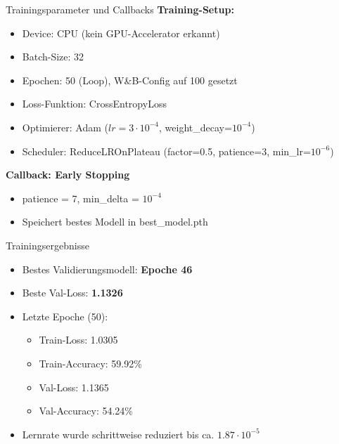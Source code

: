\documentclass{beamer}
\begin{document}
\begin{frame}{Trainingsparameter und Callbacks}
\textbf{Training-Setup:}
\begin{itemize}
    \item Device: CPU (kein GPU-Accelerator erkannt)
    \item Batch-Size: 32
    \item Epochen: 50 (Loop), W\&B-Config auf 100 gesetzt
    \item Loss-Funktion: CrossEntropyLoss
    \item Optimierer: Adam ($lr=3\cdot10^{-4}$, weight\_decay=$10^{-4}$)
    \item Scheduler: ReduceLROnPlateau (factor=0.5, patience=3, min\_lr=$10^{-6}$)
\end{itemize}

\textbf{Callback: Early Stopping}
\begin{itemize}
    \item patience = 7, min\_delta = $10^{-4}$
    \item Speichert bestes Modell in best\_model.pth
\end{itemize}
\end{frame}

\begin{frame}{Trainingsergebnisse}
\begin{itemize}
    \item Bestes Validierungsmodell: \textbf{Epoche 46}
    \item Beste Val-Loss: \textbf{1.1326}
    \item Letzte Epoche (50):
    \begin{itemize}
        \item Train-Loss: 1.0305
        \item Train-Accuracy: 59.92\%
        \item Val-Loss: 1.1365
        \item Val-Accuracy: 54.24\%
    \end{itemize}
    \item Lernrate wurde schrittweise reduziert bis ca. $1.87\cdot10^{-5}$
\end{itemize}

\end{frame}
\end{document}
